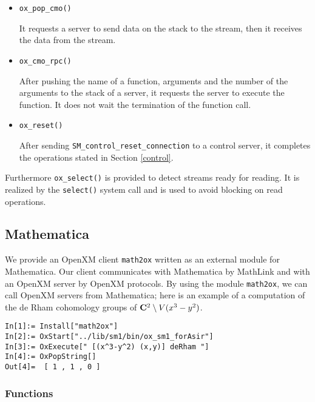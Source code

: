 \begin{itemize}
\item {\tt ox\_pop\_cmo()}

It requests a server to send data on the stack to the stream, then
it receives the data from the stream.

\item {\tt ox\_cmo\_rpc()}

After pushing the name of a function, arguments and the number of the
arguments to the stack of a server, it requests the server to execute
the function. It does not wait the termination of the function call.

\item {\tt ox\_reset()}

After sending {\tt SM\_control\_reset\_connection} to a control server,
it completes the operations stated in Section \ref{control}.
\end{itemize}
Furthermore {\tt ox\_select()} is provided to detect streams ready for
reading. It is realized by the {\tt select()} system call and is used
to avoid blocking on read operations.

\subsection{Mathematica}

We provide an OpenXM client {\tt math2ox} written as an external module
for Mathematica.  Our client communicates with Mathematica by MathLink and
with an OpenXM server by OpenXM protocols.  
By using the module {\tt math2ox},
we can call OpenXM servers from Mathematica;
here is an example of a computation of the de Rham cohomology groups
of ${\bf C}^2 \setminus V(x^3-y^2)$.
{\footnotesize
\begin{verbatim}
In[1]:= Install["math2ox"]
In[2]:= OxStart["../lib/sm1/bin/ox_sm1_forAsir"]
In[3]:= OxExecute[" [(x^3-y^2) (x,y)] deRham "]
In[4]:= OxPopString[]
Out[4]=  [ 1 , 1 , 0 ] 
\end{verbatim}
}

\subsubsection{Functions}


